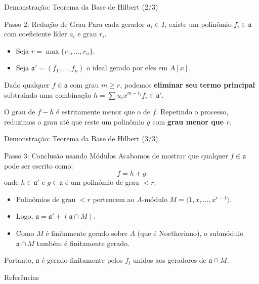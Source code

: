 \documentclass[aspectratio=169]{beamer}
\begin{document}
\begin{frame}{Demonstração: Teorema da Base de Hilbert (2/3)}
	\begin{block}{Passo 2: Redução de Grau}
		Para cada gerador $a_i \in I$, existe um polinômio $f_i \in \mathfrak{a}$ com coeficiente líder $a_i$ e grau $r_i$.
		\begin{itemize}
			\item Seja $r = \max\{r_1, \dots, r_n\}$.
			\item Seja $\mathfrak{a}' = (f_1, \dots, f_n)$ o ideal gerado por eles em $A[x]$.
		\end{itemize}

		\pause
		\vspace{0.3cm}
		Dado qualquer $f \in \mathfrak{a}$ com grau $m \geq r$, podemos \textbf{eliminar seu termo principal} subtraindo uma combinação $h = \sum u_i x^{m-r_i} f_i \in \mathfrak{a}'$.

		\pause
		\vspace{0.3cm}
		O grau de $f - h$ é estritamente menor que o de $f$. Repetindo o processo, reduzimos o grau até que reste um polinômio $g$ com \textbf{grau menor que $r$}.
	\end{block}
\end{frame}

\begin{frame}{Demonstração: Teorema da Base de Hilbert (3/3)}
	\begin{block}{Passo 3: Conclusão usando Módulos}
		Acabamos de mostrar que qualquer $f \in \mathfrak{a}$ pode ser escrito como:
		$$ f = h + g $$
		onde $h \in \mathfrak{a}'$ e $g \in \mathfrak{a}$ é um polinômio de grau $< r$.

		\pause
		\vspace{0.3cm}
		\begin{itemize}
			\item Polinômios de grau $< r$ pertencem ao $A$-módulo $M = \langle 1, x, \dots, x^{r-1} \rangle$.
			\item Logo, $\mathfrak{a} = \mathfrak{a}' + (\mathfrak{a} \cap M)$.
			      \pause
			\item Como $M$ é finitamente gerado sobre $A$ (que é Noetheriano), o submódulo $\mathfrak{a} \cap M$ também é finitamente gerado.
		\end{itemize}

		\pause
		\vspace{0.3cm}
		Portanto, $\mathfrak{a}$ é gerado finitamente pelos $f_i$ unidos aos geradores de $\mathfrak{a} \cap M$.
	\end{block}
\end{frame}

\begin{frame}{Referências}
	\nocite{*}
	\printbibliography
\end{frame}
\end{document}
